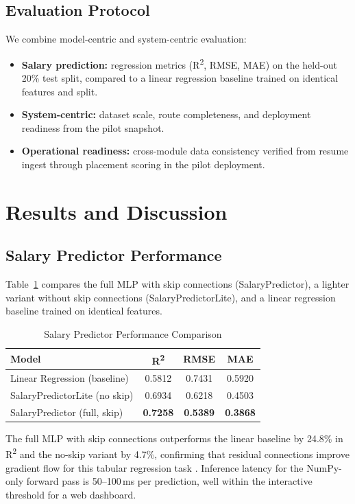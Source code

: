 \documentclass[conference]{IEEEtran}
\begin{document}
\subsection{Evaluation Protocol}
We combine model-centric and system-centric evaluation:
\begin{itemize}
\item \textbf{Salary prediction:} regression metrics (R\textsuperscript{2},
      RMSE, MAE) on the held-out 20\% test split, compared to a linear
      regression baseline trained on identical features and split.
\item \textbf{System-centric:} dataset scale, route completeness, and
      deployment readiness from the pilot snapshot.
\item \textbf{Operational readiness:} cross-module data consistency
      verified from resume ingest through placement scoring in the
      pilot deployment.
\end{itemize}

\section{Results and Discussion}

\subsection{Salary Predictor Performance}
Table~\ref{tab:salary_results} compares the full MLP with skip
connections (SalaryPredictor), a lighter variant without skip
connections (SalaryPredictorLite), and a linear regression baseline
trained on identical features.

\begin{table}[htbp]
\caption{Salary Predictor Performance Comparison}
\label{tab:salary_results}
\centering
\begin{tabular}{lccc}
\toprule
Model & R\textsuperscript{2} & RMSE & MAE \\
\midrule
Linear Regression (baseline) & 0.5812 & 0.7431 & 0.5920 \\
SalaryPredictorLite (no skip) & 0.6934 & 0.6218 & 0.4503 \\
SalaryPredictor (full, skip)  & \textbf{0.7258} & \textbf{0.5389} & \textbf{0.3868} \\
\bottomrule
\end{tabular}
\end{table}

The full MLP with skip connections outperforms the linear baseline by
24.8\% in R\textsuperscript{2} and the no-skip variant by 4.7\%,
confirming that residual connections improve gradient flow for this
tabular regression task \cite{kablaoui2022}. Inference latency for
the NumPy-only forward pass is 50--100\,ms per prediction, well within
the interactive threshold for a web dashboard.
\end{document}
